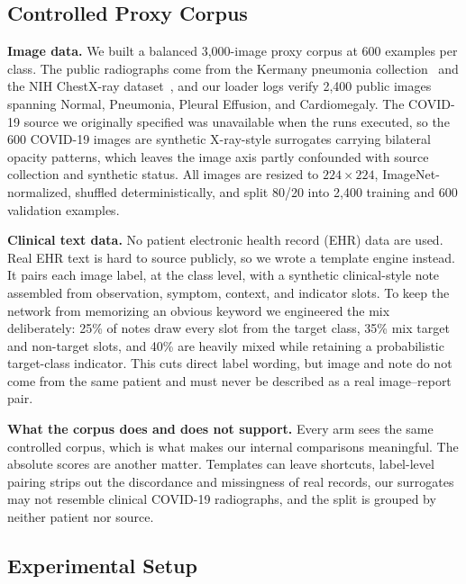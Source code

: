 \documentclass[letterpaper, conference]{IEEEtran}
\begin{document}
\subsection{Controlled Proxy Corpus}

\textbf{Image data.}
We built a balanced 3,000-image proxy corpus at 600 examples per class. The public
radiographs come from the Kermany pneumonia collection~\cite{Kermany2018} and the NIH
ChestX-ray dataset~\cite{Wang2017chestxray8}, and our loader logs verify 2,400 public
images spanning Normal, Pneumonia, Pleural Effusion, and Cardiomegaly. The COVID-19
source we originally specified was unavailable when the runs executed, so the 600
COVID-19 images are synthetic X-ray-style surrogates carrying bilateral opacity
patterns, which leaves the image axis partly confounded with source collection and
synthetic status. All images are resized to
$224{\times}224$, ImageNet-normalized, shuffled deterministically, and split 80/20
into 2,400 training and 600 validation examples.

\textbf{Clinical text data.}
No patient electronic health record (EHR) data are used. Real EHR text is hard to
source publicly, so we wrote a template engine instead. It pairs each image label, at
the class level, with a synthetic clinical-style note assembled from observation,
symptom, context, and indicator slots. To keep the network from memorizing an
obvious keyword we engineered the mix deliberately: 25\% of notes
draw every slot from the target class, 35\% mix target and non-target slots, and
40\% are heavily mixed while retaining a probabilistic target-class indicator.
This cuts direct label wording, but image and note do not come from the same
patient and must never be described as a real image--report pair.

\label{sec:corpus}
\textbf{What the corpus does and does not support.}
Every arm sees the same controlled corpus, which is what makes our internal
comparisons meaningful. The absolute scores are another matter. Templates can leave
shortcuts, label-level pairing strips out the discordance and missingness of real
records, our surrogates may not resemble clinical COVID-19 radiographs, and the split
is grouped by neither patient nor source.

\subsection{Experimental Setup}
\end{document}
